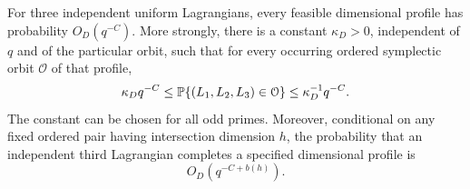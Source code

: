 \begin{proposition}
\label{prop:triple-orbits}
For three independent uniform Lagrangians, every feasible dimensional
profile has probability $O_D(q^{-C})$.  More strongly, there is a constant
$\kappa_D>0$, independent of $q$ and of the particular orbit, such that
for every occurring ordered symplectic orbit $\mathcal O$ of that profile,
\begin{equation}
 \kappa_D q^{-C}\le
 \P\{(L_1,L_2,L_3)\in\mathcal O\}
 \le \kappa_D^{-1}q^{-C}.
 \label{eq:orbits-orbit-mass}
\end{equation}
The constant can be chosen for all odd primes.  Moreover, conditional on
any fixed ordered pair having intersection dimension $h$, the probability
that an independent third Lagrangian completes a specified dimensional
profile is
\begin{equation}
 O_D(q^{-C+b(h)}).
 \label{eq:orbits-conditional-profile}
\end{equation}
\end{proposition}

